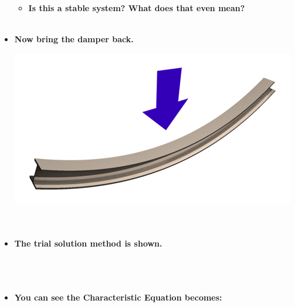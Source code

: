 \documentclass[11pt]{article}
\begin{document}
\begin{itemize}
\begin{itemize}
\item \textbf{\large Is this a stable system? What does that even mean?}\\\\


\end{itemize}
		

	\newpage
\item \textbf{ \Large Now bring the damper back.}\\
\begin{multicols}{2}
\includegraphics[scale=.40]{beam_bending_01.png} \\

 \\\\


\end{multicols}

\item \textbf{\large The trial solution method is shown.}\\\\

	 \\\\

\item \textbf{\large You can see the Characteristic Equation becomes:}\\\\

	 \\


\end{itemize}
\end{document}
